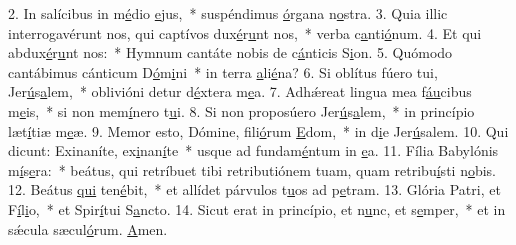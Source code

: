 2. In salícibus in m\uline{é}dio \uline{e}jus,~* suspéndimus \uline{ó}rgana n\uline{o}stra.
3. Quia illic interrogavérunt nos, qui captívos dux\uline{é}r\uline{u}nt nos,~* verba c\uline{a}nti\uline{ó}num.
4. Et qui abdux\uline{é}r\uline{u}nt nos:~* Hymnum cantáte nobis de c\uline{á}nticis S\uline{i}on.
5. Quómodo cantábimus cánticum D\uline{ó}m\uline{i}ni~* in terra \uline{a}li\uline{é}na?
6. Si oblítus fúero tui, Jer\uline{ú}s\uline{a}lem,~* oblivióni detur d\uline{é}xtera m\uline{e}a.
7. Adhǽreat lingua mea f\uline{áu}cibus m\uline{e}is,~* si non mem\uline{í}nero t\uline{u}i.
8. Si non proposúero Jer\uline{ú}s\uline{a}lem,~* in princípio læt\uline{í}tiæ m\uline{e}æ.
9. Memor esto, Dómine, fili\uline{ó}rum \uline{E}dom,~* in d\uline{i}e Jer\uline{ú}salem.
10. Qui dicunt: Exinaníte, ex\uline{i}nan\uline{í}te~* usque ad fundam\uline{é}ntum in \uline{e}a.
11. Fília Babylónis m\uline{í}s\uline{e}ra:~* beátus, qui retríbuet tibi retributiónem tuam, quam retribu\uline{í}sti n\uline{o}bis.
12. Beátus \uline{qui} ten\uline{é}bit,~* et allídet párvulos t\uline{u}os ad p\uline{e}tram.
13. Glória Patri, et F\uline{í}l\uline{i}o,~* et Spir\uline{í}tui S\uline{a}ncto.
14. Sicut erat in princípio, et n\uline{u}nc, et s\uline{e}mper,~* et in sǽcula sæcul\uline{ó}rum. \uline{A}men.
